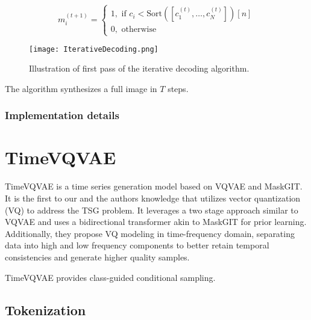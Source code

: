 \documentclass[../../thesis.tex]{subfiles}
\begin{document}
\begin{equation}
    m_i^{(t+1)} = 
    \begin{cases}
        1, \text{ if } c_i < \text{Sort}([c_1^{(t)},\dots,c_N^{(t)}])[n]\\
        0, \text{ otherwise} 
    \end{cases}
\end{equation}
\begin{figure}[h]
    \texttt{[image: IterativeDecoding.png]}
    \centering 
    \label{fig:IterativeDecoding}
    \caption{Illustration of first pass of the iterative decoding algorithm.}
\end{figure}

The algorithm synthesizes a full image in $T$ steps.  





\subsubsection{Implementation details}


\section{TimeVQVAE}

TimeVQVAE is a time series generation model based on VQVAE and MaskGIT. It is the first to our and the authors knowledge that utilizes vector quantization (VQ) to address the TSG problem. It leverages a two stage approach similar to VQVAE and uses a bidirectional transformer akin to MaskGIT for prior learning. Additionally, they propose VQ modeling in time-frequency domain, separating data into high and low frequency components to better retain temporal consistencies and generate higher quality samples.\newline

TimeVQVAE provides class-guided conditional sampling.

\subsection{Tokenization}
\end{document}
